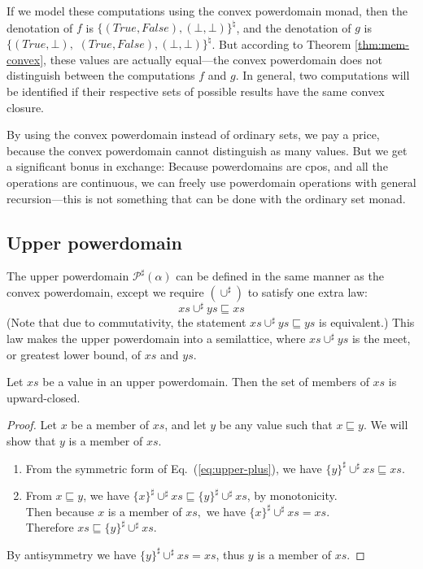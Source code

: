 If we model these computations using the convex powerdomain monad, then the denotation of $f$ is $\{(\mathit{True}, \mathit{False}), (\bot, \bot)\}^{\natural}$, and the denotation of $g$ is $\{(\mathit{True}, \bot),$ $(\mathit{True}, \mathit{False}), (\bot, \bot)\}^{\natural}$. But according to Theorem \ref{thm:mem-convex}, these values are actually equal---the convex powerdomain does not distinguish between the computations $f$ and $g$. In general, two computations will be identified if their respective sets of possible results have the same convex closure.

By using the convex powerdomain instead of ordinary sets, we pay a price, because the convex powerdomain cannot distinguish as many values. But we get a significant bonus in exchange: Because powerdomains are cpos, and all the operations are continuous, we can freely use powerdomain operations with general recursion---this is not something that can be done with the ordinary set monad.

\subsection{Upper powerdomain}

The upper powerdomain $\mathcal{P}^{\sharp}(\alpha)$ can be defined in the same manner as the convex powerdomain, except we require $(\cup^{\sharp})$ to satisfy one extra law:
\begin{equation}
xs\cup^{\sharp}ys\sqsubseteq xs
\label{eq:upper-plus}
\end{equation}
(Note that due to commutativity, the statement $xs\cup^{\sharp}ys\sqsubseteq ys$ is equivalent.) This law makes the upper powerdomain into a semilattice, where $xs\cup^{\sharp}ys$ is the meet, or greatest lower bound, of $xs$ and $ys$.

\begin{theorem}
\label{thm:mem-upper}Let $xs$ be a value in an upper powerdomain. Then the set of members of $xs$ is upward-closed.
\end{theorem}
\begin{proof}
Let $x$ be a member of $xs$, and let $y$ be any value such that $x\sqsubseteq y$. We will show that $y$ is a member of $xs$.
\begin{enumerate}
\item From the symmetric form of Eq.~(\ref{eq:upper-plus}), we have $\{y\}^{\sharp}\cup^{\sharp}xs\sqsubseteq xs$.
\item From $x\sqsubseteq y$, we have $\{x\}^{\sharp}\cup^{\sharp}xs\sqsubseteq\{y\}^{\sharp}\cup^{\sharp}xs$, by monotonicity.\\
Then because $x$ is a member of $xs,$ we have $\{x\}^{\sharp}\cup^{\sharp}xs=xs$.\\
Therefore $xs\sqsubseteq\{y\}^{\sharp}\cup^{\sharp}xs$.
\end{enumerate}
By antisymmetry we have $\{y\}^{\sharp}\cup^{\sharp}xs=xs$, thus
$y$ is a member of $xs$.
\end{proof}

